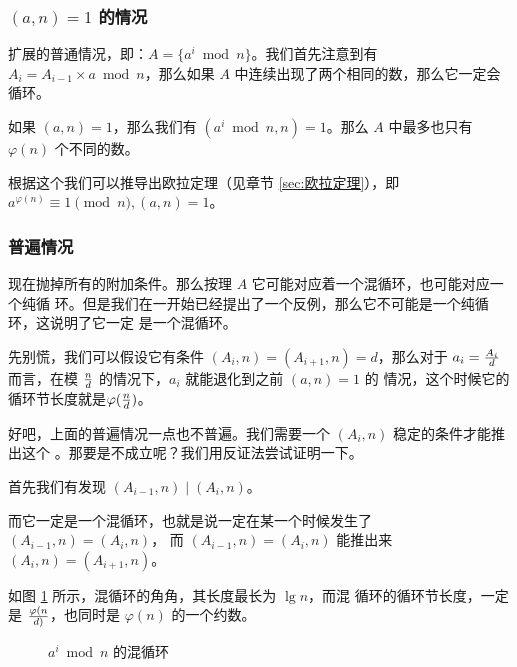 \subsubsection{$(a, n) = 1$ 的情况}
扩展的普通情况，即：$A = \{a^i \bmod n\}$。我们首先注意到有 $A_i = A_{i-1}
\times a \bmod n$，那么如果 $A$ 中连续出现了两个相同的数，那么它一定会循环。

如果 $(a, n) = 1$，那么我们有 $(a^i \bmod n, n) = 1$。那么 $A$ 中最多也只有
$\varphi(n)$ 个不同的数。

根据这个我们可以推导出欧拉定理（见章节 \ref{sec:欧拉定理}），即 $a^{\varphi(n)}
\equiv 1 \pmod n, (a, n) = 1$。


\subsubsection{普遍情况}
现在抛掉所有的附加条件。那么按理 $A$ 它可能对应着一个混循环，也可能对应一个纯循
环。但是我们在一开始已经提出了一个反例，那么它不可能是一个纯循环，这说明了它一定
是一个混循环。

先别慌，我们可以假设它有条件 $(A_i, n) = (A_{i+1}, n) = d$，那么对于 $a_i = {A_i
\over d}$ 而言，在模 $n \over d$ 的情况下，$a_i$ 就能退化到之前 $(a, n) = 1$ 的
情况，这个时候它的循环节长度就是$\varphi({n \over d})$。

好吧，上面的普遍情况一点也不普遍。我们需要一个 $(A_i, n)$ 稳定的条件才能推出这个
。那要是不成立呢？我们用反证法尝试证明一下。

首先我们有发现 $(A_{i-1}, n) \mid (A_i, n)$。

而它一定是一个混循环，也就是说一定在某一个时候发生了 $(A_{i-1}, n) = (A_i, n)$，
而 $(A_{i-1}, n) = (A_i, n)$ 能推出来 $(A_i, n) = (A_{i+1}, n)$。

如图 \ref{fig:a^i mod n 的混循环} 所示，混循环的角角，其长度最长为 $\lg n$，而混
循环的循环节长度，一定是 $\varphi(n \over d)$，也同时是 $\varphi(n)$ 的一个约数。

\begin{figure}
\centering
{}
\caption{$a^i \bmod n$ 的混循环}
\label{fig:a^i mod n 的混循环}
\end{figure}

